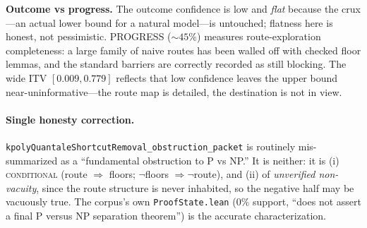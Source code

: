 \noindent\textbf{Outcome vs progress.} The outcome confidence is low and
\emph{flat} because the crux---an actual lower bound for a natural model---is
untouched; flatness here is honest, not pessimistic. PROGRESS ($\sim 45\%$)
measures route-exploration completeness: a large family of naive routes has been
walled off with checked floor lemmas, and the standard barriers are correctly
recorded as still blocking. The wide ITV $[0.009,0.779]$ reflects that low
confidence leaves the upper bound near-uninformative---the route map is
detailed, the destination is not in view.

\paragraph{Single honesty correction.}
\texttt{kpolyQuantaleShortcutRemoval\_obstruction\_packet} is routinely
mis-summarized as a ``fundamental obstruction to P vs NP.'' It is neither: it is
(i) \textsc{conditional} (route $\Rightarrow$ floors; $\lnot$floors
$\Rightarrow \lnot$route), and (ii) of \emph{unverified non-vacuity}, since the
route structure is never inhabited, so the negative half may be vacuously true.
The corpus's own \texttt{ProofState.lean} ($0\%$ support, ``does not assert a
final P versus NP separation theorem'') is the accurate characterization.
